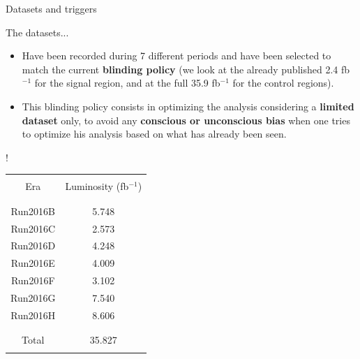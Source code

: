 \documentclass[handout,8 pt]{beamer}
\begin{document}
\begin{frame}{Datasets and triggers}

	\begin{exampleblock}{} The datasets... \end{exampleblock}
	
	\vspace{8pt}
	\begin{minipage}[c]{.59\linewidth}
	\begin{itemize}
	\justifying
	\item Have been recorded during 7 different periods and have been selected to match the current \textbf{blinding policy} (we look at the already published 2.4 fb$^{-1}$ for the signal region, and at the full 35.9 fb$^{-1}$ for the control regions). \\ \vspace{8pt}
	\item This blinding policy consists in optimizing the analysis considering a \textbf{limited dataset} only, to avoid any \textbf{conscious or unconscious bias} when one tries to optimize his analysis based on what has already been seen.
	\end{itemize} \vfill
   	\end{minipage} \hfill
   	\begin{minipage}[c]{.39\linewidth}
	\begin{center}
	\resizebox{95pt} {!}{
	\begin{tabular}{c|c}
		& \\
		Era & Luminosity (fb$^{-1}$) \\
		& \\
		\hline \hline
		& \\
		Run2016B & 5.748 \\
		Run2016C & 2.573 \\
		Run2016D & 4.248 \\
		Run2016E & 4.009 \\
		Run2016F & 3.102 \\
		Run2016G & 7.540 \\
		Run2016H & 8.606 \\ 
		& \\ 
		\hline
		& \\
		Total & 35.827 \\
		& \\
	\end{tabular}
	}
	\end{center}
   	\end{minipage} \hfill \vfill	
	

\end{frame}
\end{document}
